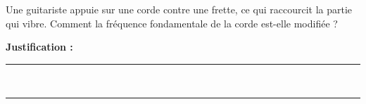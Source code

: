 Une guitariste appuie sur une corde contre une frette, ce qui raccourcit la partie qui vibre. Comment la fréquence fondamentale de la corde est-elle modifiée ?

\choices

\noindent\textbf{Justification :} \hrulefill \\[2.5ex]
\rule{\linewidth}{0.4pt} \\[2.5ex]
\rule{\linewidth}{0.4pt}
\vfill
